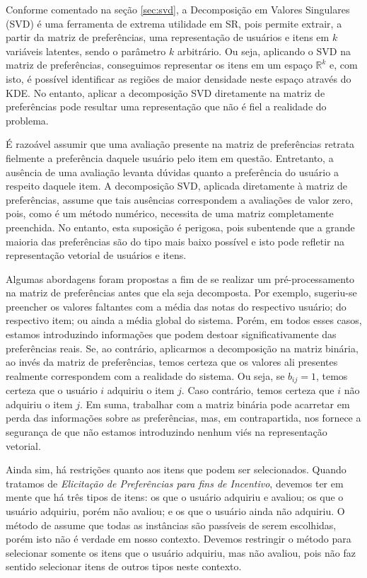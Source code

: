 Conforme comentado na seção \ref{sec:svd}, a Decomposição em Valores Singulares (SVD) é uma ferramenta de extrema utilidade em SR, pois permite extrair, a partir da matriz de preferências, uma representação de usuários e itens em $k$ variáveis latentes, sendo o parâmetro $k$ arbitrário. Ou seja, aplicando o SVD na matriz de preferências, conseguimos representar os itens em um espaço $\mathbb{R}^k$ e, com isto, é possível identificar as regiões de maior densidade neste espaço através do KDE. No entanto, aplicar a decomposição SVD diretamente na matriz de preferências pode resultar uma representação que não é fiel a realidade do problema. 

É razoável assumir que uma avaliação presente na matriz de preferências retrata fielmente a preferência daquele usuário pelo item em questão. Entretanto, a ausência de uma avaliação levanta dúvidas quanto a preferência do usuário a respeito daquele item. A decomposição SVD, aplicada diretamente à matriz de preferências, assume que tais ausências correspondem a avaliações de valor zero, pois, como é um método numérico, necessita de uma matriz completamente preenchida. No entanto, esta suposição é perigosa, pois subentende que a grande maioria das preferências são do tipo mais baixo possível e isto pode refletir na representação vetorial de usuários e itens. 

Algumas abordagens foram propostas a fim de se realizar um pré-processamento na matriz de preferências antes que ela seja decomposta. Por exemplo, sugeriu-se preencher os valores faltantes com a média das notas do respectivo usuário; do respectivo item; ou ainda a média global do sistema. Porém, em todos esses casos, estamos introduzindo informações que podem destoar significativamente das preferências reais. Se, ao contrário, aplicarmos a decomposição na matriz binária, ao invés da matriz de preferências, temos certeza que os valores ali presentes realmente correspondem com a realidade do sistema. Ou seja, se $b_{ij} = 1$, temos certeza que o usuário $i$ adquiriu o item $j$. Caso contrário, temos certeza que $i$ não adquiriu o item $j$. Em suma, trabalhar com a matriz binária pode acarretar em perda das informações sobre as preferências, mas, em contrapartida, nos fornece a segurança de que não estamos introduzindo nenhum viés na representação vetorial.

Ainda sim, há restrições quanto aos itens que podem ser selecionados. Quando tratamos de \textit{Elicitação de Preferências para fins de Incentivo}, devemos ter em mente que há três tipos de itens: os que o usuário adquiriu e avaliou; os que o usuário adquiriu, porém não avaliou; e os que o usuário ainda não adquiriu. O método de \citep{cadu:2013} assume que todas as instâncias são passíveis de serem escolhidas, porém isto não é verdade em nosso contexto. Devemos restringir o método para selecionar somente os itens que o usuário adquiriu, mas não avaliou, pois não faz sentido selecionar itens de outros tipos neste contexto.


